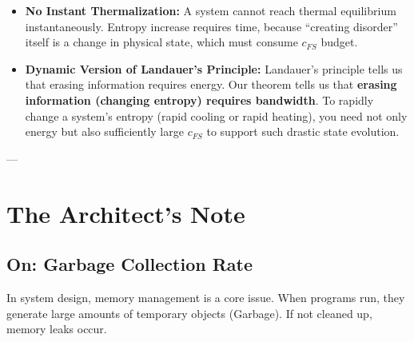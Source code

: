 \begin{itemize}
\item \textbf{No Instant Thermalization:} A system cannot reach thermal equilibrium instantaneously. Entropy increase requires time, because ``creating disorder'' itself is a change in physical state, which must consume \textbf{$c_{FS}$} budget.

\item \textbf{Dynamic Version of Landauer's Principle:} Landauer's principle tells us that erasing information requires energy. Our theorem tells us that \textbf{erasing information (changing entropy) requires bandwidth}. To rapidly change a system's entropy (rapid cooling or rapid heating), you need not only energy but also sufficiently large \textbf{$c_{FS}$} to support such drastic state evolution.
\end{itemize}

---

\section{The Architect's Note}

\subsection{On: Garbage Collection Rate}

In system design, memory management is a core issue. When programs run, they generate large amounts of temporary objects (Garbage). If not cleaned up, memory leaks occur.

